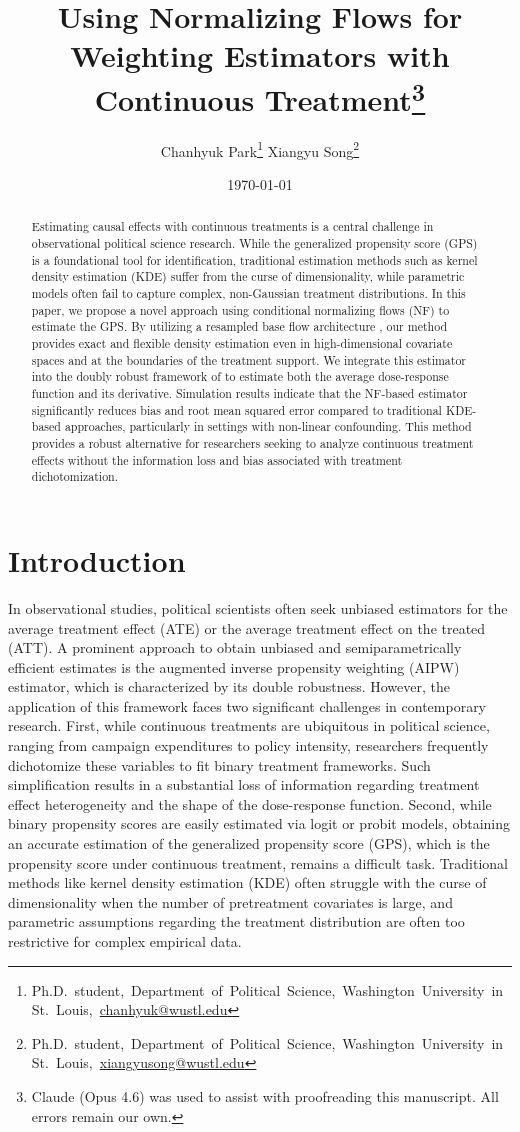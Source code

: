 \documentclass[12pt]{article}
\title{Using Normalizing Flows for Weighting Estimators with Continuous Treatment\thanks{Claude (Opus 4.6) was used to assist with proofreading this manuscript. All errors remain our own.}}
\author{Chanhyuk Park\thanks{\mbox{Ph.D. student, Department of Political Science, Washington University in St. Louis, \href{mailto:chanhyuk@wustl.edu}{chanhyuk@wustl.edu}}} \qquad Xiangyu Song\thanks{\mbox{Ph.D. student, Department of Political Science, Washington University in St. Louis, \href{mailto:xiangyusong@wustl.edu}{xiangyusong@wustl.edu}}}}
\date{\today}
\theoremstyle{definition}
\begin{document}
\maketitle

\begin{abstract}
Estimating causal effects with continuous treatments is a central challenge in observational political science research. While the generalized propensity score (GPS) is a foundational tool for identification, traditional estimation methods such as kernel density estimation (KDE) suffer from the curse of dimensionality, while parametric models often fail to capture complex, non-Gaussian treatment distributions. In this paper, we propose a novel approach using conditional normalizing flows (NF) to estimate the GPS. By utilizing a resampled base flow architecture \citep{Stimper2022a}, our method provides exact and flexible density estimation even in high-dimensional covariate spaces and at the boundaries of the treatment support. We integrate this estimator into the doubly robust framework of \citet{Zhang2025a} to estimate both the average dose-response function and its derivative. Simulation results indicate that the NF-based estimator significantly reduces bias and root mean squared error compared to traditional KDE-based approaches, particularly in settings with non-linear confounding. This method provides a robust alternative for researchers seeking to analyze continuous treatment effects without the information loss and bias associated with treatment dichotomization.
\end{abstract}

\clearpage


\section{Introduction}

In observational studies, political scientists often seek unbiased estimators for the average treatment effect (ATE) or the average treatment effect on the treated (ATT). A prominent approach to obtain unbiased and semiparametrically efficient estimates is the augmented inverse propensity weighting (AIPW) estimator, which is characterized by its double robustness. However, the application of this framework faces two significant challenges in contemporary research. First, while continuous treatments are ubiquitous in political science, ranging from campaign expenditures to policy intensity, researchers frequently dichotomize these variables to fit binary treatment frameworks. Such simplification results in a substantial loss of information regarding treatment effect heterogeneity and the shape of the dose-response function. Second, while binary propensity scores are easily estimated via logit or probit models, obtaining an accurate estimation of the generalized propensity score (GPS), which is the propensity score under continuous treatment, remains a difficult task. Traditional methods like kernel density estimation (KDE) often struggle with the curse of dimensionality when the number of pretreatment covariates is large, and parametric assumptions regarding the treatment distribution are often too restrictive for complex empirical data.
\end{document}
